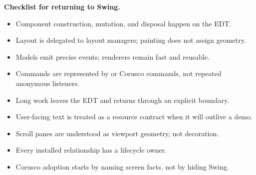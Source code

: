 \textbf{Checklist for returning to Swing.}
\begin{itemize}
\item Component construction, mutation, and disposal happen on the EDT.
\item Layout is delegated to layout managers; painting does not assign geometry.
\item Models emit precise events; renderers remain fast and reusable.
\item Commands are represented by  or Corusco commands, not repeated anonymous listeners.
\item Long work leaves the EDT and returns through an explicit boundary.
\item User-facing text is treated as a resource contract when it will outlive a demo.
\item Scroll panes are understood as viewport geometry, not decoration.
\item Every installed relationship has a lifecycle owner.
\item Corusco adoption starts by naming screen facts, not by hiding Swing.
\end{itemize}
